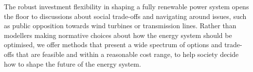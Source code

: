 The robust investment flexibility in shaping a fully renewable power system
opens the floor to discussions about social trade-offs and navigating around
issues, such as public opposition towards wind turbines or transmission lines.
Rather than modellers making normative choices about how the energy system
should be optimised, we offer methods that present a wide spectrum of options
and trade-offs that are feasible and within a reasonable cost range, to help
society decide how to shape the future of the energy system.


